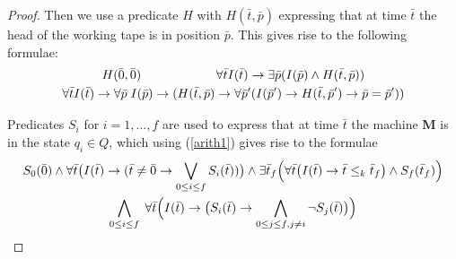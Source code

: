 \documentclass{article}
\begin{document}
\begin{proof}
Then we use a predicate $H$ with $H(\bar{t},\bar{p})$ expressing that at time $\bar{t}$ the head of the working tape is in position $\bar{p}$. This gives rise to the following formulae:
\begin{gather}
H(\bar{0},\bar{0}) \qquad\qquad\qquad \forall \bar{t} I(\bar{t}) \rightarrow \exists \bar{p} ( I(\bar{p}) \wedge H(\bar{t},\bar{p}) ) \notag \\
\forall \bar{t} I(\bar{t}) \rightarrow \forall \bar{p} \; I(\bar{p}) \rightarrow ( H(\bar{t},\bar{p}) \rightarrow \forall \bar{p}^\prime ( I(\bar{p}^\prime) \rightarrow H(\bar{t},\bar{p}^\prime) \rightarrow \bar{p} = \bar{p}^\prime ) ) \label{eq-3}
\end{gather}

Predicates $S_i$ for $i = 1 ,\dots, f$ are used to express that at time $\bar{t}$ the machine \textbf{M} is in the state $q_i \in Q$, which using (\ref{arith1}) gives rise to the formulae
\begin{gather}
S_0(\bar{0}) \wedge \forall \bar{t}\big( I(\bar{t}) \rightarrow ( \bar{t} \neq \bar{0} \rightarrow \bigvee_{0 \le i \le f} S_i(\bar{t}) )\big) \wedge 
\exists \bar{t}_f \Big( \forall \bar{t} \big( I(\bar{t}) \rightarrow \bar{t} \le_k \bar{t}_f \big)  \wedge S_f(\bar{t}_f)\Big) \notag \\
\bigwedge_{0 \le i \le f} \; \forall \bar{t} \Big(I(\bar{t}) \rightarrow \big(S_i(\bar{t}) \rightarrow \bigwedge_{0 \le j \le f, j \neq i} \neg S_j(\bar{t})\big)\Big) \label{eq-4}
\end{gather}


\end{proof}
\end{document}
